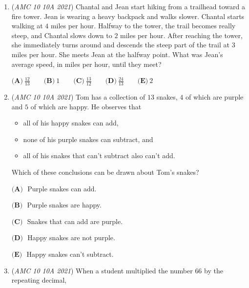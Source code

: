 \begin{enumerate}
	\item (\textit{AMC 10 10A 2021}) Chantal and Jean start hiking from a trailhead toward a fire tower. Jean is wearing a heavy backpack and walks slower. Chantal starts walking at $4$ miles per hour. Halfway to the tower, the trail becomes really steep, and Chantal slows down to $2$ miles per hour. After reaching the tower, she immediately turns around and descends the steep part of the trail at $3$ miles per hour. She meets Jean at the halfway point. What was Jean's average speed, in miles per hour, until they meet?


 $\textbf{(A)} ~\frac{12}{13} \qquad\textbf{(B)} ~1 \qquad\textbf{(C)} ~\frac{13}{12} \qquad\textbf{(D)}   ~\frac{24}{13} \qquad\textbf{(E)} ~2$


	\item (\textit{AMC 10 10A 2021}) Tom has a collection of $13$ snakes, $4$ of which are purple and $5$ of which are happy. He observes that


 
            \begin{itemize}
        \item all of his happy snakes can add,
            \end{itemize}
            
            \begin{itemize}
        \item none of his purple snakes can subtract, and
            \end{itemize}
            
            \begin{itemize}
        \item all of his snakes that can't subtract also can't add.
            \end{itemize}
            Which of these conclusions can be drawn about Tom's snakes?


 $\textbf{(A) }$ Purple snakes can add.


 $\textbf{(B) }$ Purple snakes are happy.


 $\textbf{(C) }$ Snakes that can add are purple.


 $\textbf{(D) }$ Happy snakes are not purple.


 $\textbf{(E) }$ Happy snakes can't subtract.


 

	\item (\textit{AMC 10 10A 2021}) When a student multiplied the number $66$ by the repeating decimal, 


\end{enumerate}
